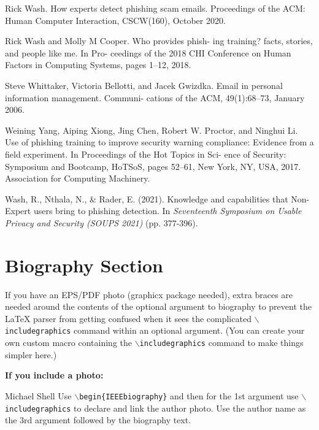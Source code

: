 \documentclass[lettersize,journal]{IEEEtran}
\begin{document}
\begin{thebibliography}{1}
  Rick Wash. How experts detect phishing scam emails. Proceedings of the ACM: Human Computer Interaction, CSCW(160), October 2020.

  Rick Wash and Molly M Cooper. Who provides phish-
  ing training? facts, stories, and people like me. In Pro-
  ceedings of the 2018 CHI Conference on Human Factors
  in Computing Systems, pages 1–12, 2018.

  Steve Whittaker, Victoria Bellotti, and Jacek Gwizdka.
  Email in personal information management. Communi-
  cations of the ACM, 49(1):68–73, January 2006.

  Weining Yang, Aiping Xiong, Jing Chen, Robert W.
  Proctor, and Ninghui Li. Use of phishing training to
  improve security warning compliance: Evidence from a
  field experiment. In Proceedings of the Hot Topics in Sci-
  ence of Security: Symposium and Bootcamp, HoTSoS,
  pages 52–61, New York, NY, USA, 2017. Association
  for Computing Machinery.

  Wash, R., Nthala, N., & Rader, E. (2021). Knowledge and capabilities that {Non-Expert} users bring to phishing detection. In \textit{Seventeenth Symposium on Usable Privacy and Security (SOUPS 2021)} (pp. 377-396).

\end{thebibliography}

\newpage

\section{Biography Section}
If you have an EPS/PDF photo (graphicx package needed), extra braces are needed
around the contents of the optional argument to biography to prevent the LaTeX
parser from getting confused when it sees the complicated
$\backslash${\tt{includegraphics}} command within an optional argument. (You
can create your own custom macro containing the
$\backslash${\tt{includegraphics}} command to make things simpler here.)

\vspace{11pt}

\bf{If you include a photo:}\vspace{-33pt}
\begin{IEEEbiography}{Michael Shell}
  Use $\backslash${\tt{begin\{IEEEbiography\}}} and then for the 1st argument use $\backslash${\tt{includegraphics}} to declare and link the author photo.
  Use the author name as the 3rd argument followed by the biography text.
\end{IEEEbiography}
\end{document}
